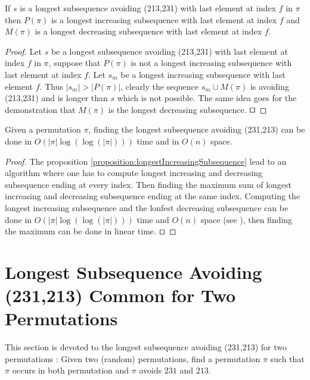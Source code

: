 \documentclass[a4paper]{llncs}
\newcommand{\ptext}{\pi}
\newcounter{num}
\begin{document}
	\begin{proposition}
	\label{proposition:longestIncreasingSubsequence}
	If $s$ is a longest subsequence avoiding (213,231) with last element at index $f$ in $\pi$ then
	$P(\pi)$ is a longest increasing subsequence with last element at index $f$ and
	$M(\pi)$ is a longest decreasing subsequence with last element at index $f$.
	\end{proposition}

	\begin{proof}
	Let $s$ be a longest subsequence avoiding (213,231) with last element at index $f$ in $\pi$,
	suppose that $P(\pi)$ is not a longest increasing subsequence with last element at index $f$. Let $s_m$ be a longest increasing subsequence with last element $f$.
	Thus $|s_m|>|P(\pi)|$, clearly the sequence $s_m \cup M(\pi)$
	is avoiding (213,231) and is longer than $s$ which is not possible.
	The same idea goes for the demonstration that $M(\pi)$ is the longest decreasing subsequence.
	$\qed$
	\end{proof}

	\begin{proposition}
	Given a permutation $\pi$,
	finding the longest subsequence avoiding (231,213)
	can be done in $O(|\ptext|\log(\log(|\ptext|)))$ time and in $O(n)$ space.
	\end{proposition}

	\begin{proof}
	The proposition \ref{proposition:longestIncreasingSubsequence} lead to an algorithm
	where one has to compute longest increasing and decreasing subsequence ending at every index. Then finding the maximum sum of longest increasing and decreasing subsequence ending at the same index.
	Computing the longest increasing subsequence and the  lonfest decreasing subsequence can be done in $O(|\ptext|\log(\log(|\ptext|)))$ time and $O(n)$ space (see \cite{Bespamyatnikh00enumeratinglongest}), then finding the maximum can be done in linear time.
	$\qed$
	\end{proof}


\section{Longest Subsequence Avoiding \\(231,213) Common for Two Permutations}
\label{section:LCS common 2 permutations}

This section is devoted to the longest subsequence avoiding (231,213) for two permutations : Given two (random) permutations, find a permutation $\pi$ such that $\pi$ occurs in both permutation and $\pi$ avoids $231$ and $213$. 
\end{document}
